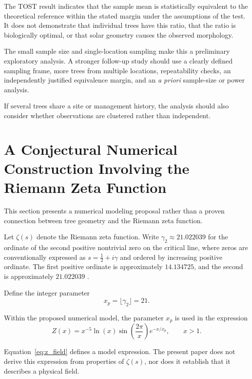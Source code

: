 \documentclass[11pt,a4paper]{article}
\begin{document}
The TOST result indicates that the sample mean is
statistically equivalent to the theoretical reference
within the stated margin under the assumptions of the test.
It does not demonstrate that individual trees have this
ratio, that the ratio is biologically optimal, or that solar
geometry causes the observed morphology.

The small sample size and single-location sampling make
this a preliminary exploratory analysis. A stronger follow-up
study should use a clearly defined sampling frame, more trees
from multiple locations, repeatability checks, an
independently justified equivalence margin, and an
\textit{a priori} sample-size or power analysis.

If several trees share a site or management history, the
analysis should also consider whether observations are
clustered rather than independent.

\section{A Conjectural Numerical Construction Involving
the Riemann Zeta Function}

This section presents a numerical modeling proposal rather
than a proven connection between tree geometry and the
Riemann zeta function.

Let \(\zeta(s)\) denote the Riemann zeta function. Write
\(\gamma_2\approx21.022039\) for the ordinate of the second
positive nontrivial zero on the critical line, where zeros
are conventionally expressed as
\(s=\frac12+i\gamma\) and ordered by increasing positive
ordinate. The first positive ordinate is approximately
\(14.134725\), and the second is approximately \(21.022039\)
\cite{edwards1974}.

Define the integer parameter
\begin{equation}
    x_p=\lfloor\gamma_2\rfloor=21.
    \label{eq:xp}
\end{equation}

Within the proposed numerical model, the parameter \(x_p\)
is used in the expression
\begin{equation}
    Z(x)=x^{-5}\ln(x)\sin\left(\frac{2\pi}{x}\right)
    e^{-x/x_p},
    \qquad x>1.
    \label{eq:z_field}
\end{equation}

Equation~\eqref{eq:z_field} defines a model expression.
The present paper does not derive this expression from
properties of \(\zeta(s)\), nor does it establish that it
describes a physical field.
\end{document}
